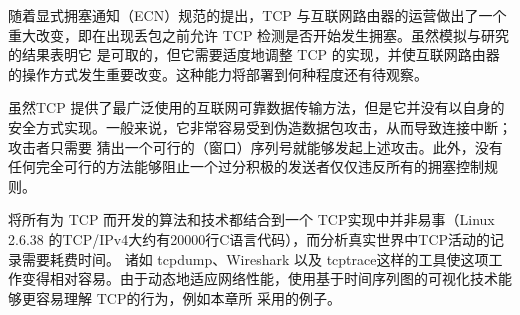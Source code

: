 随着显式拥塞通知（ECN）规范的提出，TCP 与互联网路由器的运营做出了一个重大改变，即在出现丢包之前允许 TCP 检测是否开始发生拥塞。虽然模拟与研究的结果表明它
是可取的，但它需要适度地调整 TCP 的实现，并使互联网路由器的操作方式发生重要改变。这种能力将部署到何种程度还有待观察。

虽然TCP 提供了最广泛使用的互联网可靠数据传输方法，但是它并没有以自身的安全方式实现。一般来说，它非常容易受到伪造数据包攻击，从而导致连接中断；攻击者只需要
猜出一个可行的（窗口）序列号就能够发起上述攻击。此外，没有任何完全可行的方法能够阻止一个过分积极的发送者仅仅违反所有的拥塞控制规则。

将所有为 TCP 而开发的算法和技术都结合到一个 TCP实现中并非易事（Linux 2.6.38 的TCP/IPv4大约有20000行C语言代码），而分析真实世界中TCP活动的记录需要耗费时间。
诸如 tcpdump、Wireshark 以及 tcptrace这样的工具使这项工作变得相对容易。由于动态地适应网络性能，使用基于时间序列图的可视化技术能够更容易理解 TCP的行为，例如本章所
采用的例子。\citep{alizadeh2010data} \citep{aggarwal2000understanding}


